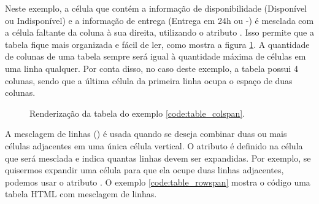 Neste exemplo, a célula que contém a informação de disponibilidade (Disponível ou Indisponível) e a informação de entrega (Entrega em 24h ou -) é mesclada com a célula faltante da coluna à sua direita, utilizando o atributo . Isso permite que a tabela fique mais organizada e fácil de ler, como mostra a figura \ref{fig:table_colspan}. A quantidade de colunas de uma tabela sempre será igual à quantidade máxima de células em uma linha qualquer. Por conta disso, no caso deste exemplo, a tabela possui 4 colunas, sendo que a última célula da primeira linha ocupa o espaço de duas colunas.

\begin{figure}[ht!]    
    \caption{Renderização da tabela do exemplo \ref{code:table_colspan}.}
    \label{fig:table_colspan}
\end{figure}

A mesclagem de linhas () é usada quando se deseja combinar duas ou mais células adjacentes em uma única célula vertical. O atributo  é definido na célula que será mesclada e indica quantas linhas devem ser expandidas. Por exemplo, se quisermos expandir uma célula para que ela ocupe duas linhas adjacentes, podemos usar o atributo . O exemplo \ref{code:table_rowspan} mostra o código uma tabela HTML com mesclagem de linhas.


